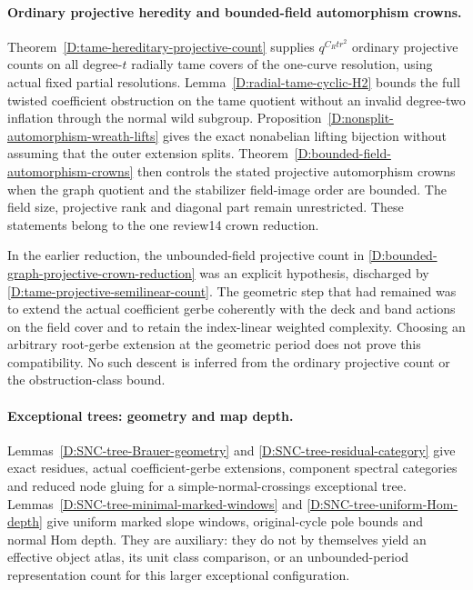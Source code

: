 \paragraph{Ordinary projective heredity and bounded-field automorphism crowns.}
Theorem~\ref{D:tame-hereditary-projective-count} supplies
$q^{C_Rtr^2}$ ordinary projective counts on all degree-$t$ radially
tame covers of the one-curve resolution, using actual fixed partial
resolutions. Lemma~\ref{D:radial-tame-cyclic-H2} bounds the full
twisted coefficient obstruction on the tame quotient without an
invalid degree-two inflation through the normal wild subgroup.
Proposition~\ref{D:nonsplit-automorphism-wreath-lifts} gives the exact
nonabelian lifting bijection without assuming that the outer
extension splits. Theorem~\ref{D:bounded-field-automorphism-crowns}
then controls the stated projective automorphism crowns when the
graph quotient and the stabilizer field-image order are bounded.
The field size, projective rank and diagonal part remain unrestricted.
These statements belong to the one review14 crown reduction.

In the earlier reduction, the unbounded-field projective count in
\ref{D:bounded-graph-projective-crown-reduction} was an explicit
hypothesis, discharged by \ref{D:tame-projective-semilinear-count}. The geometric step that had remained was to extend the actual
coefficient gerbe coherently with the deck and band actions on the
field cover and to retain the index-linear weighted complexity.
Choosing an arbitrary root-gerbe extension at the geometric period
does not prove this compatibility. No such descent is inferred from
the ordinary projective count or the obstruction-class bound.

\paragraph{Exceptional trees: geometry and map depth.}
Lemmas~\ref{D:SNC-tree-Brauer-geometry} and
\ref{D:SNC-tree-residual-category} give exact residues, actual
coefficient-gerbe extensions, component spectral categories and
reduced node gluing for a simple-normal-crossings exceptional tree.
Lemmas~\ref{D:SNC-tree-minimal-marked-windows} and
\ref{D:SNC-tree-uniform-Hom-depth} give uniform marked slope windows,
original-cycle pole bounds and normal Hom depth. They are auxiliary:
they do not by themselves yield an effective object atlas, its unit
class comparison, or an unbounded-period representation count for
this larger exceptional configuration.



